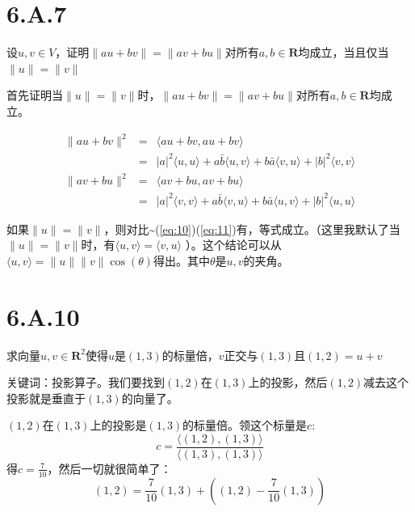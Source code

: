 \documentclass[10pt,a4paper,UTF8]{article}
\begin{document}
\section{6.A.7}
\label{sec:org3ef0c68}


\begin{tikzproblem}
设\(u,v\in V\)，证明\(\| au + bv \| = \| av + bu \|\)对所有\(a,b\in \mathbf{R}\)均成立，当且仅当\(\| u \| = \| v \|\)
\end{tikzproblem}

\begin{tikzanswer}
首先证明当\(\| u \| = \| v \|\)时，\(\| au + bv \| = \| av + bu \|\)对所有\(a,b\in \mathbf{R}\)均成立。

\begin{eqnarray}
\label{eq:10}
\| au + bv \|^{2} &=& \langle au + bv, au + bv \rangle  \\
&=& |a|^{2} \langle u,u \rangle  + a\bar{b} \langle u,v \rangle + b\bar{a} \langle v,u \rangle  + |b|^{2} \langle v,v \rangle
\end{eqnarray}
\begin{eqnarray}
\label{eq:11}
\| av + bu \|^{2} &=& \langle av+bu,av+bu \rangle  \\
&=& |a|^{2} \langle v,v \rangle + a\bar{b} \langle v,u \rangle + b\bar{a} \langle u,v \rangle + |b|^{2} \langle u,u \rangle
\end{eqnarray}

如果\(\| u \| = \| v \|\)，则对比\textasciitilde{}(\ref{eq:10})(\ref{eq:11})有，等式成立。（这里我默认了当\(\| u \|  = \| v \|\)时，有\(\langle u,v \rangle  = \langle v,u \rangle\) ）。这个结论可以从 \(\langle u,v \rangle   =  \| u \| \| v \|\cos(\theta)\)得出。其中\(\theta\)是\(u,v\)的夹角。
\end{tikzanswer}
\section{6.A.10}
\label{sec:orgd129035}


\begin{tikzproblem}
求向量\(u,v\in \mathbf{R}^{2}\)使得\(u\)是\((1,3)\)的标量倍，\(v\)正交与\((1,3)\)且\((1,2) = u+ v\)
\end{tikzproblem}

\begin{tikzanswer}
关键词：投影算子。我们要找到\((1,2)\)在\((1,3)\)上的投影，然后\((1,2)\)减去这个投影就是垂直于\((1,3)\)的向量了。

\((1,2)\)在\((1,3)\)上的投影是\((1,3)\)的标量倍。领这个标量是\(c\):
\begin{equation}
\label{eq:12}
c = \frac{ \langle (1,2),(1,3) \rangle  }{ \langle (1,3),(1,3) \rangle  }
\end{equation}
得\(c = \tfrac{7}{10}\)，然后一切就很简单了：
\begin{equation}
\label{eq:13}
(1,2) = \frac{7}{10}(1,3) + ( (1,2) - \frac{7}{10}(1,3) )
\end{equation}
\end{tikzanswer}
\end{document}
